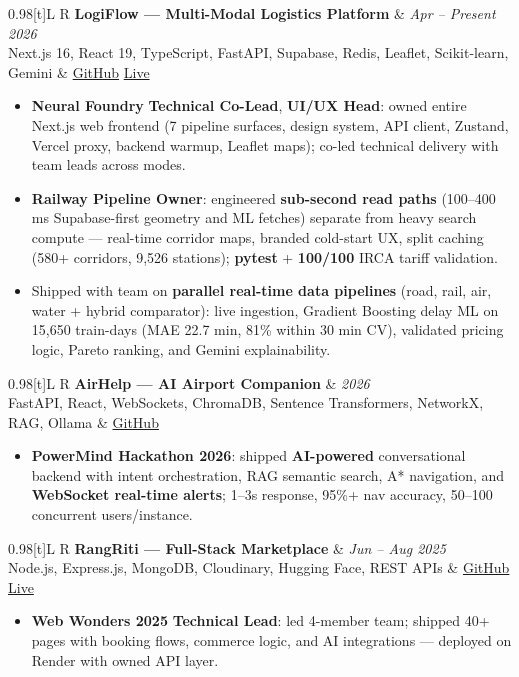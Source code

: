 \documentclass[a4paper,10pt]{article}
\newcommand{\resumeProject}[4]{
  \vspace{0.5mm}\item
  \begin{tabularx}{0.98\textwidth}[t]{L R}
    \textbf{#1} & \textit{\footnotesize #3} \\
    \footnotesize #2 & \footnotesize #4 \\
  \end{tabularx}
  \vspace{-2.4mm}
}
\newcommand{\resumeItemListStart}{\begin{justify}\begin{itemize}[leftmargin=3ex, rightmargin=2ex, noitemsep,labelsep=1.2mm,itemsep=0mm]\small}
\newcommand{\resumeItemListEnd}{\end{itemize}\end{justify}\vspace{-2mm}}
\begin{document}
  \resumeProject
    {LogiFlow --- Multi-Modal Logistics Platform}
    {Next.js 16, React 19, TypeScript, FastAPI, Supabase, Redis, Leaflet, Scikit-learn, Gemini}
    {Apr -- Present 2026}
    {\href{https://github.com/Ojas-Srivastava05/LogiFlow-Solution-Challenge-2026}{GitHub} \textbar{} \href{https://logi-flow-solution-challenge-2026.vercel.app}{Live}}
    \resumeItemListStart
      \item \textbf{Neural Foundry} \textbar{} \textbf{Technical Co-Lead}, \textbf{UI/UX Head}: owned entire Next.js web frontend (7 pipeline surfaces, design system, API client, Zustand, Vercel proxy, backend warmup, Leaflet maps); co-led technical delivery with team leads across modes.
      \item \textbf{Railway Pipeline Owner}: engineered \textbf{sub-second read paths} (100--400 ms Supabase-first geometry and ML fetches) separate from heavy search compute --- real-time corridor maps, branded cold-start UX, split caching (580+ corridors, 9,526 stations); \textbf{pytest} + \textbf{100/100} IRCA tariff validation.
      \item Shipped with team on \textbf{parallel real-time data pipelines} (road, rail, air, water + hybrid comparator): live ingestion, Gradient Boosting delay ML on 15,650 train-days (MAE 22.7 min, 81\% within 30 min CV), validated pricing logic, Pareto ranking, and Gemini explainability.
    \resumeItemListEnd
  \vspace{-2mm}

  \resumeProject
    {AirHelp --- AI Airport Companion}
    {FastAPI, React, WebSockets, ChromaDB, Sentence Transformers, NetworkX, RAG, Ollama}
    {2026}
    {\href{https://github.com/Ojas-Srivastava05/AirHelp-AI-Airport-Assistant}{GitHub}}
    \resumeItemListStart
      \item \textbf{PowerMind Hackathon 2026}: shipped \textbf{AI-powered} conversational backend with intent orchestration, RAG semantic search, A* navigation, and \textbf{WebSocket real-time alerts}; 1--3s response, 95\%+ nav accuracy, 50--100 concurrent users/instance.
    \resumeItemListEnd
  \vspace{-2mm}

  \resumeProject
    {RangRiti --- Full-Stack Marketplace}
    {Node.js, Express.js, MongoDB, Cloudinary, Hugging Face, REST APIs}
    {Jun -- Aug 2025}
    {\href{https://github.com/Ojas-Srivastava05/RangRiti}{GitHub} \textbar{} \href{https://rangriti.onrender.com/}{Live}}
    \resumeItemListStart
      \item \textbf{Web Wonders 2025} \textbar{} \textbf{Technical Lead}: led 4-member team; shipped 40+ pages with booking flows, commerce logic, and AI integrations --- deployed on Render with owned API layer.
    \resumeItemListEnd
\end{document}
